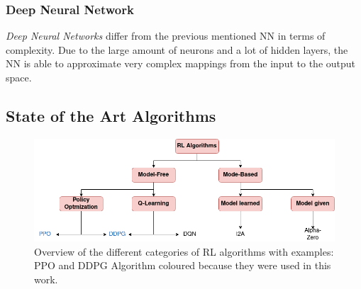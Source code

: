 \subsubsection{Deep Neural Network}
\emph{Deep Neural Networks} differ from the previous mentioned NN in terms of complexity. Due to the large amount of neurons and a lot of hidden layers, the NN is able to approximate very complex mappings from the input to the output space.


\subsection{State of the Art Algorithms}
\begin{figure}
	\centering
	\includegraphics[width=\linewidth]{figures/algo.png}
	\caption{Overview of the different categories of RL algorithms with examples: PPO and DDPG Algorithm coloured because they were used in this work.}
	\label{fig:algo}
\end{figure}

